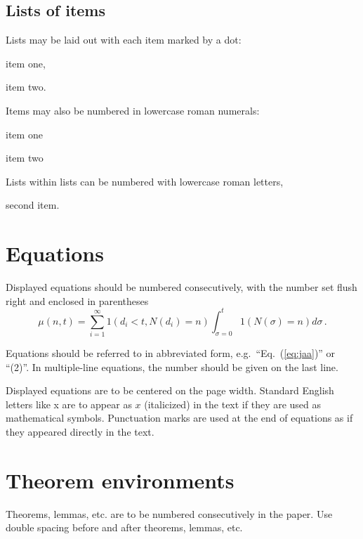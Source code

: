 \documentclass{ws-ijcga}
\begin{document}
\subsection{Lists of items}

Lists may be laid out with each item marked by a dot:
\begin{itemlist}
 \item item one,
 \item item two.
\end{itemlist}
Items may also be numbered in lowercase roman numerals:
\begin{romanlist}
\item item one
\item item two 
	\begin{romanlist}[(b)]
	\item Lists within lists can be numbered with lowercase 
              roman letters,
	\item second item. 
	\end{romanlist}
\end{romanlist}

\section{Equations}

Displayed equations should be numbered consecutively,
with the number set flush right and enclosed in parentheses
\begin{equation}
\mu(n, t) = {\sum^\infty_{i=1} 1(d_i < t, N(d_i) 
= n)}{\int^t_{\sigma=0} 1(N(\sigma) = n)d\sigma}\,.
\label{eq:jaa}
\end{equation}

Equations should be referred to in abbreviated form,
e.g.~``Eq.~(\ref{eq:jaa})'' or ``(2)''. In multiple-line
equations, the number should be given on the last line.

Displayed equations are to be centered on the page width.
Standard English letters like x are to appear as $x$
(italicized) in the text if they are used as mathematical
symbols. Punctuation marks are used at the end of equations as
if they appeared directly in the text.

\section{Theorem environments}

\begin{theorem} \label{theo1}
Theorems, lemmas, etc. are to be numbered consecutively in the
paper. Use double spacing before and after theorems, lemmas, etc.
\end{theorem}
\end{document}
